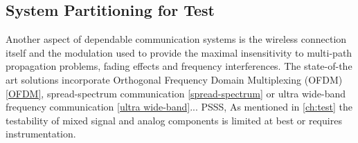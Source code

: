 \subsection{System Partitioning for Test}
Another aspect of dependable communication systems is the wireless connection itself and the modulation used to provide the maximal insensitivity to multi-path propagation problems, fading effects and frequency interferences. The state-of-the art solutions incorporate Orthogonal Frequency Domain Multiplexing (OFDM) \ref{OFDM}, spread-spectrum communication \ref{spread-spectrum} or ultra wide-band frequency communication \ref{ultra wide-band}...
PSSS, 
 As mentioned in \autoref{ch:test} the testability of mixed signal and analog components is limited at best or requires instrumentation. 
